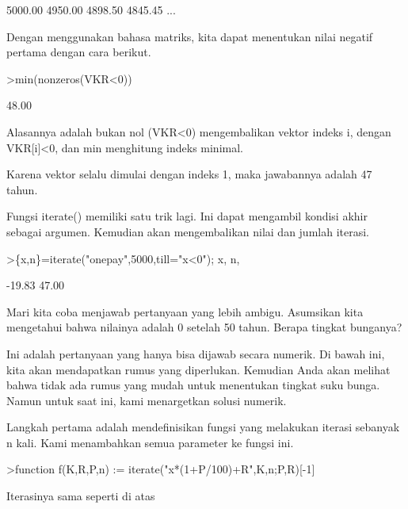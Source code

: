 \documentclass[a4paper,10pt]{article}
\begin{document}
\begin{eulernotebook}
\begin{eulercomment}
\begin{eulercomment}
\begin{eulercomment}
\begin{eulercomment}
\begin{eulercomment}
\begin{eulercomment}
\begin{eulercomment}
\begin{eulercomment}
\begin{euleroutput}
      5000.00     4950.00     4898.50     4845.45     ...
\end{euleroutput}
\begin{eulercomment}
Dengan menggunakan bahasa matriks, kita dapat menentukan nilai negatif
pertama dengan cara berikut.
\end{eulercomment}
\begin{eulerprompt}
>min(nonzeros(VKR<0))
\end{eulerprompt}
\begin{euleroutput}
        48.00 
\end{euleroutput}
\begin{eulercomment}
Alasannya adalah bukan nol (VKR\textless{}0) mengembalikan vektor indeks i,
dengan VKR[i]\textless{}0, dan min menghitung indeks minimal.

Karena vektor selalu dimulai dengan indeks 1, maka jawabannya adalah
47 tahun.

Fungsi iterate() memiliki satu trik lagi. Ini dapat mengambil kondisi
akhir sebagai argumen. Kemudian akan mengembalikan nilai dan jumlah
iterasi.
\end{eulercomment}
\begin{eulerprompt}
>\{x,n\}=iterate("onepay",5000,till="x<0"); x, n,
\end{eulerprompt}
\begin{euleroutput}
       -19.83 
        47.00 
\end{euleroutput}
\begin{eulercomment}
Mari kita coba menjawab pertanyaan yang lebih ambigu. Asumsikan kita
mengetahui bahwa nilainya adalah 0 setelah 50 tahun. Berapa tingkat
bunganya?

Ini adalah pertanyaan yang hanya bisa dijawab secara numerik. Di bawah
ini, kita akan mendapatkan rumus yang diperlukan. Kemudian Anda akan
melihat bahwa tidak ada rumus yang mudah untuk menentukan tingkat suku
bunga. Namun untuk saat ini, kami menargetkan solusi numerik.

Langkah pertama adalah mendefinisikan fungsi yang melakukan iterasi
sebanyak n kali. Kami menambahkan semua parameter ke fungsi ini.
\end{eulercomment}
\begin{eulerprompt}
>function f(K,R,P,n) := iterate("x*(1+P/100)+R",K,n;P,R)[-1]
\end{eulerprompt}
\begin{eulercomment}
Iterasinya sama seperti di atas


\end{eulercomment}
\end{eulercomment}
\end{eulercomment}
\end{eulercomment}
\end{eulercomment}
\end{eulercomment}
\end{eulercomment}
\end{eulercomment}
\end{eulercomment}
\end{eulernotebook}
\end{document}
